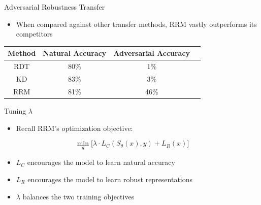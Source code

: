 \documentclass{beamer}
\begin{document}
\begin{frame}{Adversarial Robustness Transfer}
	
	
	\begin{itemize}
		\item When compared against other transfer methods, RRM vastly outperforms its competitors
	\end{itemize}

	\begin{center}
		\begin{tabular}{ |c|c|c|c| } 
			\hline
			Method & Natural Accuracy & Adversarial Accuracy \\
			\hline
			RDT & 80\% & 1\% \\
			KD & 83\% & 3\% \\
			RRM & 81\% & 46\% \\
			\hline
		\end{tabular}
	\end{center}
	
\end{frame}




\begin{frame}{Tuning $\lambda$}
	
	\begin{itemize}
		\item Recall RRM's optimization objective:
	\end{itemize}

	$$\min_\theta \biggr [ \lambda \cdot L_C(S_\theta(x), y) + L_R(x) \biggr ]$$
	
	\begin{itemize}
		\item $L_C$ encourages the model to learn natural accuracy
		\item $L_R$ encourages the model to learn robust representations
		\item $\lambda$ balances the two training objectives
	\end{itemize}
	
\end{frame}
\end{document}
